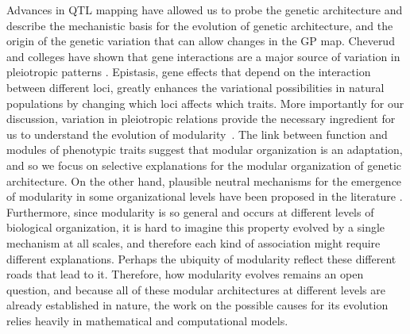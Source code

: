 \begin{refsection}
Advances in QTL mapping have allowed us to probe the genetic
architecture and describe the mechanistic basis for the evolution of
genetic architecture, and the origin of the genetic variation that can
allow changes in the GP map. Cheverud and colleges have shown that gene
interactions are a major source of variation in pleiotropic patterns
\parencite{Wolf2005-nr, Pavlicev2008-jy}. Epistasis, gene effects that
depend on the interaction between different loci, greatly enhances the
variational possibilities in natural populations by changing which loci
affects which traits. More importantly for our discussion, variation in
pleiotropic relations provide the necessary ingredient for us to
understand the evolution of modularity~\parencite{Wagner1996-ui}. The link
between function and modules of phenotypic traits suggest that modular
organization is an adaptation, and so we focus on selective explanations
for the modular organization of genetic architecture. On the other hand,
plausible neutral mechanisms for the emergence of modularity in some
organizational levels have been proposed in the literature
\parencite{Wagner2007-cx, Lynch2007-kz}. Furthermore, since modularity is so
general and occurs at different levels of biological organization, it is
hard to imagine this property evolved by a single mechanism at all
scales, and therefore each kind of association might require different
explanations. Perhaps the ubiquity of modularity reflect these different
roads that lead to it. Therefore, how modularity evolves remains an open
question, and because all of these modular architectures at different
levels are already established in nature, the work on the possible
causes for its evolution relies heavily in mathematical and
computational models.


\end{refsection}
